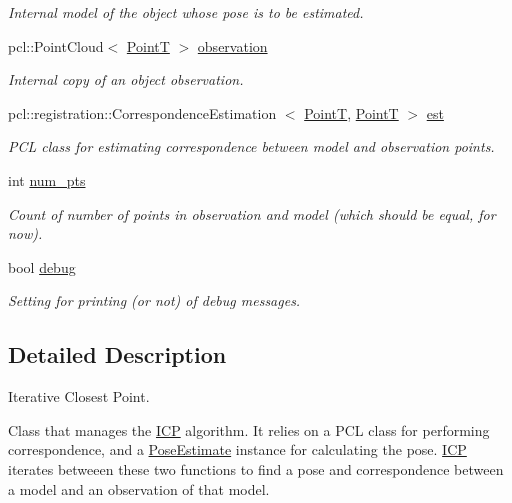 \begin{DoxyCompactItemize}
\begin{DoxyCompactList}\small\item\em \-Internal model of the object whose pose is to be estimated. \end{DoxyCompactList}\item 
pcl\-::\-Point\-Cloud$<$ \hyperlink{common_8h_abd10555a534258e2739a38c928ef5db1}{\-Point\-T} $>$ \hyperlink{classICP_a92b2b3089759aad730cb92a0976aea1b}{observation}
\begin{DoxyCompactList}\small\item\em \-Internal copy of an object observation. \end{DoxyCompactList}\item 
pcl\-::registration\-::\-Correspondence\-Estimation\*
$<$ \hyperlink{common_8h_abd10555a534258e2739a38c928ef5db1}{\-Point\-T}, \hyperlink{common_8h_abd10555a534258e2739a38c928ef5db1}{\-Point\-T} $>$ \hyperlink{classICP_acf6194ebbf168e4a6059945980752849}{est}
\begin{DoxyCompactList}\small\item\em \-P\-C\-L class for estimating correspondence between model and observation points. \end{DoxyCompactList}\item 
int \hyperlink{classICP_a9b8cf5129a0cb5ad3fd05b261d514bb6}{num\-\_\-pts}
\begin{DoxyCompactList}\small\item\em \-Count of number of points in observation and model (which should be equal, for now). \end{DoxyCompactList}\item 
bool \hyperlink{classICP_a6e81d1444353ba66d59cd16d2dc74d7c}{debug}
\begin{DoxyCompactList}\small\item\em \-Setting for printing (or not) of debug messages. \end{DoxyCompactList}\end{DoxyCompactItemize}


\subsection{\-Detailed \-Description}
\-Iterative \-Closest \-Point. 

\-Class that manages the \hyperlink{classICP}{\-I\-C\-P} algorithm. \-It relies on a \-P\-C\-L class for performing correspondence, and a \hyperlink{classPoseEstimate}{\-Pose\-Estimate} instance for calculating the pose. \hyperlink{classICP}{\-I\-C\-P} iterates betweeen these two functions to find a pose and correspondence between a model and an observation of that model.


